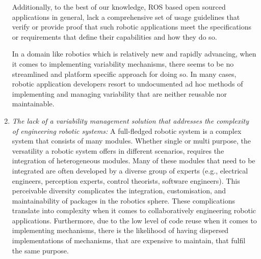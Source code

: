 \documentclass[conference]{IEEEtran}
\begin{document}
\begin{enumerate}
    Additionally, to the best of our knowledge, ROS based open sourced applications in general, lack a comprehensive set of usage guidelines that verify or provide proof that such robotic applications meet the specifications or requirements that define their capabilities and how they do so.
    
    In a domain like robotics which is relatively new and rapidly advancing, when it comes to implementing variability mechanisms, there seems to be no streamlined and platform specific approach for doing so. In many cases, robotic application developers resort to undocumented ad hoc methods of implementing and managing variability that are neither reusable nor maintainable.
    
    \item \textit{The lack of a variability management solution that addresses the complexity of engineering robotic systems: }A full-fledged robotic system is a complex system that consists of many modules. Whether single or multi purpose, the versatility a robotic system offers in different scenarios, requires the integration of heterogeneous modules. Many of these modules that need to be integrated are often developed by a diverse group of experts (e.g., electrical engineers, perception experts, control theorists, software engineers). This perceivable diversity complicates the integration, customisation, and maintainability of packages in the robotics sphere. These complications translate into complexity when it comes to collaboratively engineering robotic applications. Furthermore, due to the low level of code reuse when it comes to implementing mechanisms, there is the likelihood of having dispersed implementations of mechanisms, that are expensive to maintain, that fulfil the same purpose.
\end{enumerate}
\end{document}
